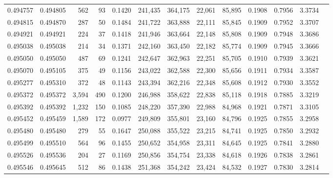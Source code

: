 \begin{tabular}{rrrrrrrrrrrrr}
0.494757 & 0.494805 &   562 &    93 &                                     0.1420 & 241,435 & 364,175 &  22,061 &  85,895 & 0.1908 & 0.7956 & 3.3734 \\
0.494815 & 0.494870 &   287 &    50 &                                     0.1484 & 241,722 & 363,888 &  22,111 &  85,845 & 0.1909 & 0.7952 & 3.3707 \\
0.494921 & 0.494921 &   224 &    37 &                                     0.1418 & 241,946 & 363,664 &  22,148 &  85,808 & 0.1909 & 0.7948 & 3.3686 \\
0.495038 & 0.495038 &   214 &    34 &                                     0.1371 & 242,160 & 363,450 &  22,182 &  85,774 & 0.1909 & 0.7945 & 3.3666 \\
0.495050 & 0.495050 &   487 &    69 &                                     0.1241 & 242,647 & 362,963 &  22,251 &  85,705 & 0.1910 & 0.7939 & 3.3621 \\
0.495070 & 0.495105 &   375 &    49 &                                     0.1156 & 243,022 & 362,588 &  22,300 &  85,656 & 0.1911 & 0.7934 & 3.3587 \\
0.495277 & 0.495310 &   372 &    48 &                                     0.1143 & 243,394 & 362,216 &  22,348 &  85,608 & 0.1912 & 0.7930 & 3.3552 \\
0.495372 & 0.495372 & 3,594 &   490 &                                     0.1200 & 246,988 & 358,622 &  22,838 &  85,118 & 0.1918 & 0.7885 & 3.3219 \\
0.495392 & 0.495392 & 1,232 &   150 &                                     0.1085 & 248,220 & 357,390 &  22,988 &  84,968 & 0.1921 & 0.7871 & 3.3105 \\
0.495452 & 0.495459 & 1,589 &   172 &                                     0.0977 & 249,809 & 355,801 &  23,160 &  84,796 & 0.1925 & 0.7855 & 3.2958 \\
0.495480 & 0.495480 &   279 &    55 &                                     0.1647 & 250,088 & 355,522 &  23,215 &  84,741 & 0.1925 & 0.7850 & 3.2932 \\
0.495499 & 0.495510 &   564 &    96 &                                     0.1455 & 250,652 & 354,958 &  23,311 &  84,645 & 0.1925 & 0.7841 & 3.2880 \\
0.495526 & 0.495536 &   204 &    27 &                                     0.1169 & 250,856 & 354,754 &  23,338 &  84,618 & 0.1926 & 0.7838 & 3.2861 \\
0.495546 & 0.495645 &   512 &    86 &                                     0.1438 & 251,368 & 354,242 &  23,424 &  84,532 & 0.1927 & 0.7830 & 3.2814 \\

\end{tabular}
